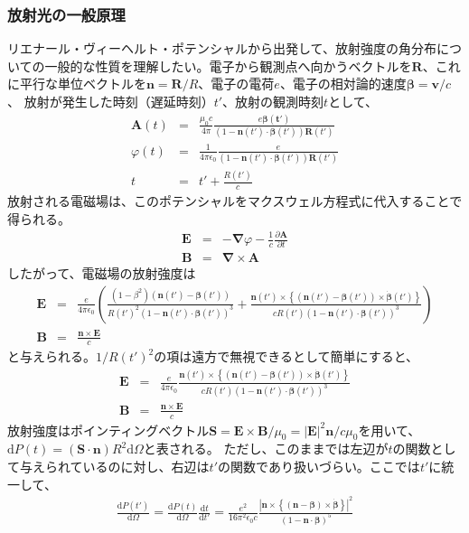 \documentclass[a4paper,11pt,uplatex]{jsbook}
\begin{document}
\subsubsection{放射光の一般原理}\label{sec:general radiation}
リエナール・ヴィーヘルト・ポテンシャルから出発して、放射強度の角分布についての一般的な性質を理解したい。電子から観測点へ向かうベクトルを$\bm{R}$、これに平行な単位ベクトルを$\bm{n} = \bm{R}/R$、電子の電荷$e$、電子の相対論的速度$\bm{\beta} = \bm{v}/c$、
放射が発生した時刻（遅延時刻）$t'$、放射の観測時刻$t$として、
\begin{eqnarray}
  \bm{A}(t) &=& \frac{\mu_0 c}{4\pi}\frac{e\bm{\beta(t')}}{(1-\bm{n}(t')\cdot\bm{\beta}(t'))\bm{R}(t')}\label{retarded potential}\\
  \varphi(t) &=& \frac{1}{4\pi \epsilon_0}\frac{e}{(1-\bm{n}(t')\cdot\bm{\beta}(t'))\bm{R}(t')}\label{retarded potential phi}\\
  t &=& t' + \frac{R(t')}{c}
\end{eqnarray}
放射される電磁場は、このポテンシャルをマクスウェル方程式に代入することで得られる。
\begin{eqnarray}
  \bm{E} &=& -\bm{\nabla} \varphi - \frac{1}{c}\frac{\partial \bm{A}}{\partial t}\\
  \bm{B} &=& \bm{\nabla} \times \bm{A}
\end{eqnarray}
したがって、電磁場の放射強度は
\begin{eqnarray}
  \bm{E} &=& \frac{e}{4\pi \epsilon_0}\left( \frac{(1-\beta^2)(\bm{n}(t')-\bm{\beta}(t'))}{R(t')^2(1-\bm{n}(t')\cdot\bm{\beta}(t'))^3}+
  \frac{\bm{n}(t')\times \left\{ (\bm{n}(t')-\bm{\beta}(t'))\times \bm{\dot{\beta}}(t')\right\}}{cR(t')(1-\bm{n}(t')\cdot\bm{\beta}(t'))^3} \right)\\
  \bm{B} &=& \frac{\bm{n}\times\bm{E}}{c}
\end{eqnarray}
と与えられる。$1/R(t')^2$の項は遠方で無視できるとして簡単にすると、
\begin{eqnarray}\label{eq:e field}
  \bm{E} &=& \frac{e}{4\pi \epsilon_0}\frac{\bm{n}(t')\times \left\{ (\bm{n}(t')-\bm{\beta}(t'))\times \bm{\dot{\beta}}(t')\right\}}{cR(t')(1-\bm{n}(t')\cdot\bm{\beta}(t'))^3}\\
  \bm{B} &=& \frac{\bm{n}\times\bm{E}}{c}
\end{eqnarray}
放射強度はポインティングベクトル$\bm{S} =\bm{E}\times \bm{B}/\mu_0 = |\bm{E}|^2\bm{n}/c\mu_0$を用いて、$\text{d}P(t) = (\bm{S}\cdot\bm{n})R^2\text{d}\Omega$と表される。
ただし、このままでは左辺が$t$の関数として与えられているのに対し、右辺は$t'$の関数であり扱いづらい。ここでは$t'$に統一して、
\begin{eqnarray} \label{eq:power}
  \frac{\text{d}P(t')}{\text{d}\Omega} = \frac{\text{d}P(t)}{\text{d}\Omega}\frac{\text{d}t}{\text{d}t'} = \frac{e^2}{16\pi^2 \epsilon_0 c}\frac{\left|\bm{n}\times \left\{ (\bm{n}-\bm{\beta})\times \bm{\dot{\beta}}\right\}\right|^2}{(1-\bm{n}\cdot\bm{\beta})^5}
\end{eqnarray}
\end{document}
